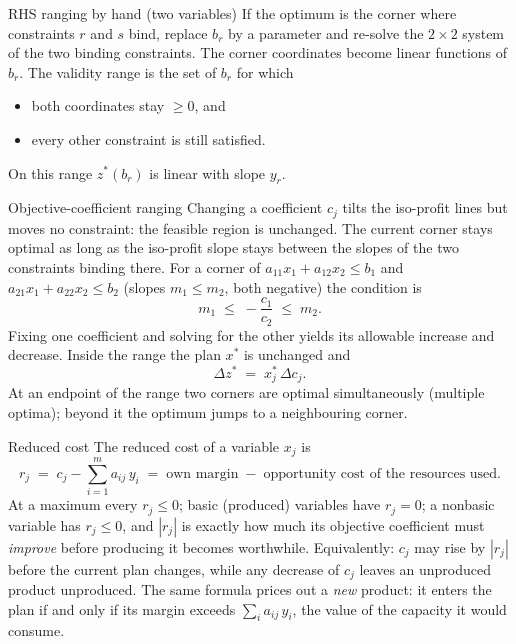 \begin{rulebox}{RHS ranging by hand (two variables)}
If the optimum is the corner where constraints $r$ and $s$ bind, replace
$b_{r}$ by a parameter and re-solve the $2\times 2$ system of the two
binding constraints. The corner coordinates become linear functions of
$b_{r}$. The validity range is the set of $b_{r}$ for which
\begin{itemize}[leftmargin=1.6em,itemsep=0.3ex]
  \item both coordinates stay $\ge 0$, and
  \item every other constraint is still satisfied.
\end{itemize}
On this range $z^{*}(b_{r})$ is linear with slope $y_{r}$.
\end{rulebox}

\begin{rulebox}{Objective-coefficient ranging}
Changing a coefficient $c_{j}$ tilts the iso-profit lines but moves no
constraint: the feasible region is unchanged. The current corner stays
optimal as long as the iso-profit slope stays between the slopes of the two
constraints binding there. For a corner of
$a_{11}x_{1}+a_{12}x_{2}\le b_{1}$ and $a_{21}x_{1}+a_{22}x_{2}\le b_{2}$
(slopes $m_{1}\le m_{2}$, both negative) the condition is
\[
  m_{1}\;\le\;-\frac{c_{1}}{c_{2}}\;\le\;m_{2}.
\]
Fixing one coefficient and solving for the other yields its allowable
increase and decrease. Inside the range the plan $x^{*}$ is unchanged and
\[
  \Delta z^{*}\;=\;x_{j}^{*}\,\Delta c_{j}.
\]
At an endpoint of the range two corners are optimal simultaneously
(multiple optima); beyond it the optimum jumps to a neighbouring corner.
\end{rulebox}

\begin{rulebox}{Reduced cost}
The reduced cost of a variable $x_{j}$ is
\[
  r_{j} \;=\; c_{j}-\sum_{i=1}^{m}a_{ij}\,y_{i}
  \;=\;\text{own margin}\;-\;\text{opportunity cost of the resources used}.
\]
At a maximum every $r_{j}\le 0$; basic (produced) variables have
$r_{j}=0$; a nonbasic variable has $r_{j}\le 0$, and $|r_{j}|$ is exactly
how much its objective coefficient must \emph{improve} before producing it
becomes worthwhile. Equivalently: $c_{j}$ may rise by $|r_{j}|$ before the
current plan changes, while any decrease of $c_{j}$ leaves an unproduced
product unproduced. The same formula prices out a \emph{new} product: it
enters the plan if and only if its margin exceeds
$\sum_{i}a_{ij}\,y_{i}$, the value of the capacity it would consume.
\end{rulebox}

